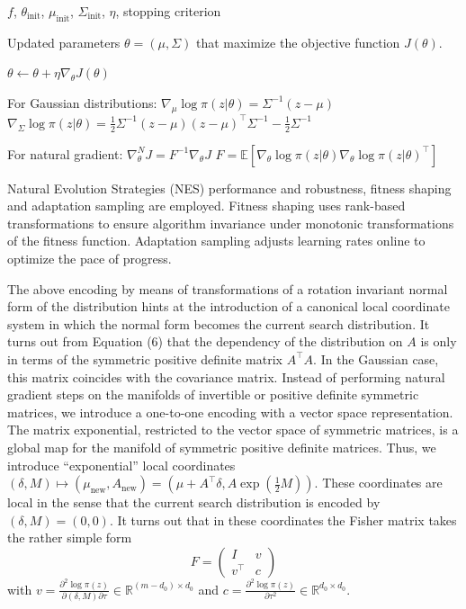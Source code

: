 
$f$, $\theta_{\text{init}}$, $\mu_{\text{init}}$, $\Sigma_{\text{init}}$, $\eta$, stopping criterion

Updated parameters $\theta = (\mu, \Sigma)$ that maximize the objective function $J(\theta)$.

$\theta \leftarrow \theta + \eta \nabla_\theta J(\theta)$

For Gaussian distributions:
$\nabla_\mu \log \pi (z | \theta) = \Sigma^{-1} (z - \mu)$
$\nabla_\Sigma \log \pi (z | \theta) = \frac{1}{2} \Sigma^{-1} (z - \mu) (z - \mu)^\top \Sigma^{-1} - \frac{1}{2} \Sigma^{-1}$

For natural gradient:
$\nabla_\theta^N J = F^{-1} \nabla_\theta J$
$F = \mathbb{E} \left[ \nabla_\theta \log \pi (z|\theta) \nabla_\theta \log \pi (z|\theta)^\top \right]$

Natural Evolution Strategies (NES) performance and robustness, fitness shaping and adaptation sampling are employed. Fitness shaping uses rank-based transformations to ensure algorithm invariance under monotonic transformations of the fitness function. Adaptation sampling adjusts learning rates online to optimize the pace of progress. 

The above encoding by means of transformations of a rotation invariant normal form of the distribution hints at the introduction of a canonical local coordinate system in which the normal form becomes the current search distribution. It turns out from Equation (6) that the dependency of the distribution on $A$ is only in terms of the symmetric positive definite matrix $A^\top A$. In the Gaussian case, this matrix coincides with the covariance matrix. Instead of performing natural gradient steps on the manifolds of invertible or positive definite symmetric matrices, we introduce a one-to-one encoding with a vector space representation. The matrix exponential, restricted to the vector space of symmetric matrices, is a global map for the manifold of symmetric positive definite matrices. Thus, we introduce “exponential” local coordinates $(\delta, M) \mapsto (\mu_{\text{new}}, A_{\text{new}}) = (\mu + A^\top \delta, A \exp \left( \frac{1}{2} M \right))$. These coordinates are local in the sense that the current search distribution is encoded by $(\delta, M) = (0, 0)$. It turns out that in these coordinates the Fisher matrix takes the rather simple form
\[
F = \begin{pmatrix}
I & v \\
v^\top & c
\end{pmatrix}
\]
with $v = \frac{\partial^2 \log \pi(z)}{\partial (\delta, M) \partial \tau} \in \mathbb{R}^{(m-d_0) \times d_0}$ and $c = \frac{\partial^2 \log \pi(z)}{\partial \tau^2} \in \mathbb{R}^{d_0 \times d_0}$. 

